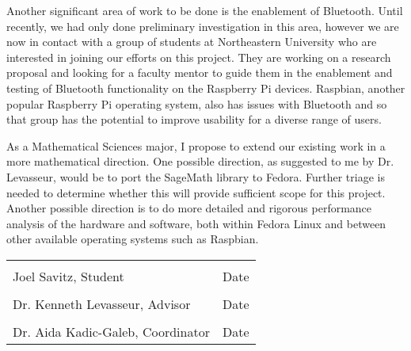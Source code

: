 \documentclass[12pt]{amsart}
\begin{document}
Another significant area of work to be done is the enablement of Bluetooth. Until recently, we had only done preliminary investigation in this area, however we are now in contact with a group of students at Northeastern University who are interested in joining our efforts on this project. They are working on a research proposal and looking for a faculty mentor to guide them in the enablement and testing of Bluetooth functionality on the Raspberry Pi devices. Raspbian, another popular Raspberry Pi operating system, also has issues with Bluetooth and so that group has the potential to improve usability for a diverse range of users.

As a Mathematical Sciences major, I propose to extend our existing work in a more mathematical direction. One possible direction, as suggested to me by Dr. Levasseur, would be to port the SageMath library to Fedora. Further triage is needed to determine whether this will provide sufficient scope for this project. Another possible direction is to do more detailed and rigorous performance analysis of the hardware and software, both within Fedora Linux and between other available operating systems such as Raspbian.

\noindent\begin{tabular}{ll}
	\\[4ex]
	\makebox[4in]{\hrulefill} & \makebox[1.5in]{\hrulefill} \\
	Joel Savitz, Student & Date \\[5ex]
	\makebox[4in]{\hrulefill} & \makebox[1.5in]{\hrulefill} \\
	Dr. Kenneth Levasseur, Advisor & Date \\[5ex]
	\makebox[4in]{\hrulefill} & \makebox[1.5in]{\hrulefill} \\
	Dr. Aida Kadic-Galeb, Coordinator & Date \\[5ex]
\end{tabular}
\end{document}
